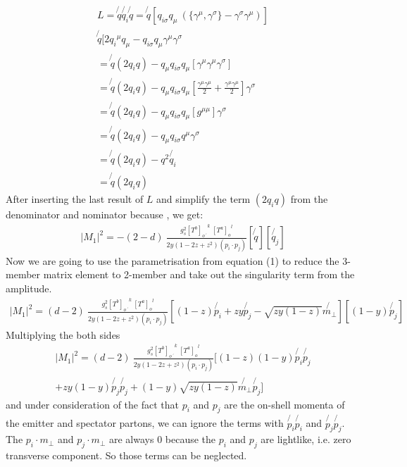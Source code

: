 \begin{equation}
\begin{split}
L=\not{q} \not{q_i} \not{q} =\not{q}[{q_{i\sigma}} q_{\mu} \: (\lbrace{\gamma^{\mu}}, {\gamma^{\sigma}}\rbrace - {\gamma^{\sigma}}{\gamma^{\mu}})]\\ 
\not{q}[2{q_{i}}^{\mu} q_{\mu} - {q_{i\sigma}}q_{\mu}{\gamma^{\mu}}{\gamma^{\sigma}}\\
=\not{q} (2q_i q)-q_{\mu}{q_{i\sigma}}q_{\mu}[{\gamma^{\mu}}{\gamma^{\mu}}{\gamma^{\sigma}}]\\
=\not{q} (2q_i q)-q_{\mu}{q_{i\sigma}}q_{\mu}[\frac{{\gamma^{\mu}}{\gamma^{\mu}}}{2} +\frac{{\gamma^{\mu}}{\gamma^{\mu}}}{2}]{\gamma^{\sigma}}\\
=\not{q} (2q_i q)-q_{\mu}{q_{i\sigma}}q_{\mu}[g^{{\mu}{\mu}}]{\gamma^{\sigma}}\\
=\not{q} (2q_i q)-q_{\mu}{q_{i\sigma}}q^{\mu}{\gamma^{\sigma}}\\
=\not{q} (2q_i q)-q^2 \not{q_i}\\
=\not{q} (2q_i q)
\end{split}
\end{equation}
After inserting the last result of $ L $ and simplify the term $ (2q_i q) $ from the denominator and nominator because , we get:
\begin{equation}
\begin{split}
|M_1|^2=-(2-d)\:\frac{g_s^2  {[T^b]_{o\:^{\prime}}}^k \: {[T^a]_o}^l }{2y(1-2z+z^2)(p_i \cdot p_j)}
[\not{q}]
[\not{q_j}]
\end{split}
\end{equation}
Now we are going to use the parametrisation from equation (1) to reduce the 3-member matrix element to 2-member and take out the singularity term from the amplitude.
\begin{equation}
\begin{split}
|M_1|^2=(d-2)\:\frac{g_s^2  {[T^b]_{o\:^{\prime}}}^k \: {[T^a]_o}^l }{2y(1-2z+z^2)(p_i \cdot p_j)}
[(1-z) \not{p_i}+zy \not{p_j} - \sqrt{zy(1-z)} \not{{m}_{\bot}}]
[(1-y) \not{p_j}]
\end{split}
\end{equation}
Multiplying the both sides 
\begin{equation}
\begin{split}
|M_1|^2=(d-2)\:\frac{g_s^2  {[T^b]_{o\:^{\prime}}}^k \: {[T^a]_o}^l }{2y(1-2z+z^2)(p_i \cdot p_j)}
[(1-z)(1-y) \not{p_i}\not{p_j} \\
+zy(1-y) \not{p_j}\not{p_j} + (1-y)\sqrt{zy(1-z)} \not{{m}_{\bot}}\not{p_j}]
\end{split}
\end{equation}
and under consideration of the fact that $ p_i $ and $ p_j $ are the on-shell momenta of the emitter and spectator partons, we can ignore the terms with $ \not{p_i} \not{p_i} $ and $ \not{p_j} \not{p_j} $.
The $ {p_i} \cdot  {m}_{\bot} $ and $ {p_j} \cdot  {m}_{\bot} $ are always $ 0 $ because the $ p_i $ and $ p_j $ are lightlike, i.e. zero transverse component. So those terms can be neglected.


